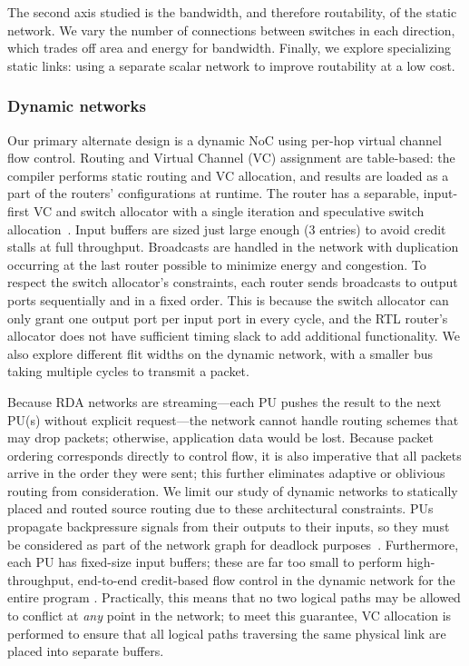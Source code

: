 The second axis studied is the bandwidth, and therefore routability, of the static network. 
We vary the number of connections between switches in each direction, which trades off area and energy for bandwidth.
Finally, we explore specializing static links: using a separate scalar network to improve routability at a low cost.

\subsubsection{Dynamic networks}
Our primary alternate design is a dynamic NoC using per-hop virtual channel flow control. 
Routing and Virtual Channel (VC) assignment are table-based: the compiler performs static routing and VC allocation, 
and results are loaded as a part of the routers' configurations at runtime.
The router has a separable, input-first VC and switch allocator with a single iteration and speculative switch allocation~\cite{dallytowles}.
Input buffers are sized just large enough (3 entries) to avoid credit stalls at full throughput.
Broadcasts are handled in the network with duplication occurring at the last router possible to minimize energy and congestion.
To respect the switch allocator's constraints, each router sends broadcasts to output ports sequentially and in a fixed order.
This is because the switch allocator can only grant one output port per input port in every cycle, and the RTL router's allocator does not have sufficient timing slack to add additional functionality.
We also explore different flit widths on the dynamic network, with a smaller bus taking multiple cycles to transmit a packet.

Because RDA networks are streaming---each PU pushes the result to the next PU(s) without explicit request---the network cannot handle routing schemes that may drop packets; otherwise, application data would be lost.
Because packet ordering corresponds directly to control flow, it is also imperative that all packets arrive in the order they were sent; this further eliminates adaptive or oblivious routing from consideration.
We limit our study of dynamic networks to statically placed and routed source routing due to these architectural constraints.
PUs propagate backpressure signals from their outputs to their inputs, so they must be considered as part of the network graph for deadlock purposes~\cite{hansson2007avoiding}.
Furthermore, each PU has fixed-size input buffers; these are far too small to perform high-throughput, end-to-end credit-based flow control in the dynamic network for the entire program \cite{wang2013avoiding}.
Practically, this means that no two logical paths may be allowed to conflict at \emph{any} point in the network; to meet this guarantee, VC allocation is performed to ensure that all logical paths traversing the same physical link are placed into separate buffers.

